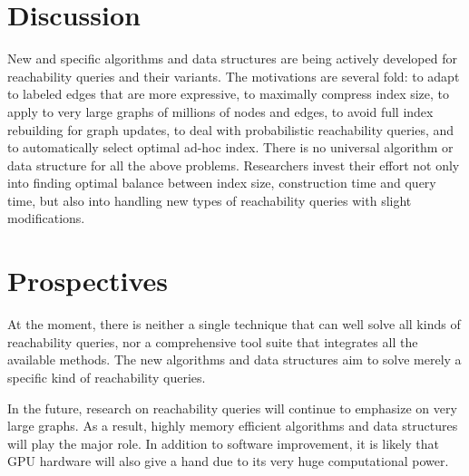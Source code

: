 \documentclass[12pt,conference,compsocconf]{../IEEEtran}
\begin{document}
\section{Discussion}

New and specific algorithms and data structures are being actively developed for reachability queries and their variants. The motivations are several fold: to adapt to labeled edges that are more expressive, to maximally compress index size, to apply to very large graphs of millions of nodes and edges, to avoid full index rebuilding for graph updates, to deal with probabilistic reachability queries, and to automatically select optimal ad-hoc index. There is no universal algorithm or data structure for all the above problems. Researchers invest their effort not only into finding optimal balance between index size, construction time and query time, but also into handling new types of reachability queries with slight modifications.

\section{Prospectives}

At the moment, there is neither a single technique that can well solve all kinds of reachability queries, nor a comprehensive tool suite that integrates all the available methods. The new algorithms and data structures aim to solve merely a specific kind of reachability queries.

In the future, research on reachability queries will continue to emphasize on very large graphs. As a result, highly memory efficient algorithms and data structures will play the major role. In addition to software improvement, it is likely that GPU hardware will also give a hand due to its very huge computational power.



\end{document}
